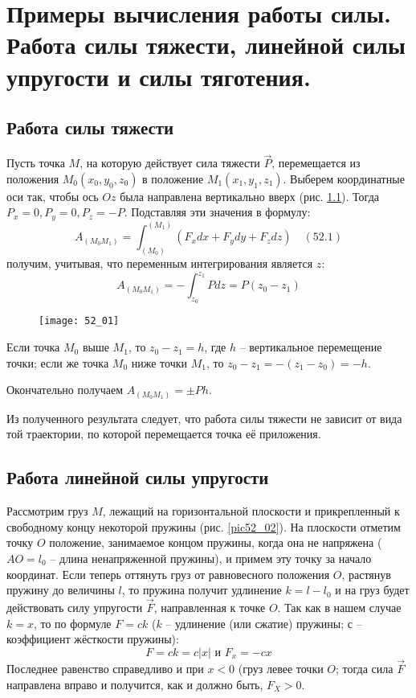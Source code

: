 \chapter{Примеры вычисления работы силы. Работа силы тяжести, линейной силы
упругости и силы тяготения.}

\section{Работа силы тяжести}
Пусть точка \( M \), на которую действует сила тяжести \( \vec{P} \), 
перемещается из положения \( M_0(x_0, y_0, z_0) \) в положение 
\( M_1(x_1, y_1, z_1) \). Выберем координатные оси так, чтобы ось \( Oz \) 
была направлена вертикально вверх (рис. \ref{pic52_01}). Тогда 
\( P_x = 0, P_y = 0, P_z = -P \). Подставляя эти значения в формулу:
\[ 
    A_{(M_0 M_1)} = \int_{(M_0)}^{(M_1)} 
    \left( F_x dx + F_y dy + F_z dz \right) \quad (52.1)
\]
получим, учитывая, что переменным интегрирования является \( z \):
\[ 
    A_{(M_0 M_1)} = - \int_{z_0}^{z_1} Pdz = 
    P\left(z_0 - z_1 \right) 
\]

\begin{figure}[h!]
    \texttt{[image: 52\_01]}
    \parbox{.47\textwidth}{\caption{} \label{pic52_01}}
\end{figure}

Если точка \( M_0 \) выше \( M_1 \), то \( z_0 - z_1 = h \), где 
\( h \) -- вертикальное перемещение точки; если же точка \( M_0 \) ниже 
точки \( M_1 \), то \( z_0 - z_1 = -\left(z_1 - z_0\right) = -h \).

Окончательно получаем \( A_{(M_0 M_1)} = \pm Ph \).

Из полученного результата следует, что работа силы тяжести не зависит от 
вида той траектории, по которой перемещается точка её приложения.

\section{Работа линейной силы упругости}
Рассмотрим груз \( M \), лежащий на горизонтальной плоскости и 
прикрепленный к свободному концу некоторой пружины (рис. \ref{pic52_02}). На 
плоскости отметим точку \( O \) положение, занимаемое концом пружины, 
когда она не напряжена (\( AO = l_0 \) -- длина ненапряженной пружины), и 
примем эту точку за начало координат. Если теперь оттянуть груз от 
равновесного положения \( O \), растянув пружину до величины \( l \), то
пружина получит удлинение \( k = l - l_0 \) и на груз будет действовать 
силу упругости \( \vec{F} \), направленная к точке \( O \). Так как в 
нашем случае \( k = x \), то по формуле \( F = ck \) 
(\( k \) -- удлинение (или сжатие) пружины; \( с \) -- коэффициент 
жёсткости пружины):
\[ F = ck = c|x| \text{ и } F_x = -cx \]
Последнее равенство справедливо и при \( x < 0 \) 
(груз левее точки \( O \); тогда сила \( \vec{F} \) направлена вправо и 
получится, как и должно быть, \( F_X > 0 \).

